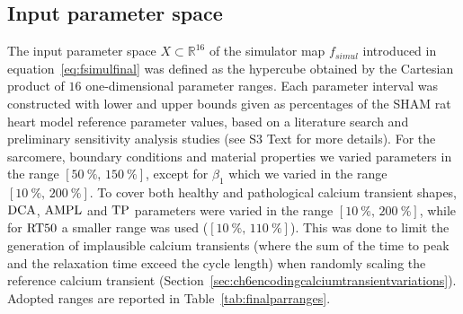 \subsection{Input parameter space}\label{sec:ch7inputparameterspace}
The input parameter space $X\subset\mathbb{R}^{16}$ of the simulator map $f_{simul}$ introduced in equation~\eqref{eq:fsimulfinal} was defined as the hypercube obtained by the Cartesian product of $16$ one-dimensional parameter ranges. Each parameter interval was constructed with lower and upper bounds given as percentages of the SHAM rat heart model reference parameter values, based on a literature search and preliminary sensitivity analysis studies (see S3 Text for more details). For the sarcomere, boundary conditions and material properties we varied parameters in the range $[\SI{50}{\percent},\,\SI{150}{\percent}]$, except for $\beta_1$ which we varied in the range $[\SI{10}{\percent},\,\SI{200}{\percent}]$. To cover both healthy and pathological calcium transient shapes, $\textrm{DCA}$, $\textrm{AMPL}$ and $\textrm{TP}$ parameters were varied in the range $[\SI{10}{\percent},\,\SI{200}{\percent}]$, while for $\textrm{RT50}$ a smaller range was used ($[\SI{10}{\percent},\,\SI{110}{\percent}]$). This was done to limit the generation of implausible calcium transients (where the sum of the time to peak and the relaxation time exceed the cycle length) when randomly scaling the reference calcium transient (Section~\ref{sec:ch6encodingcalciumtransientvariations}). Adopted ranges are reported in Table~\ref{tab:finalparranges}.

